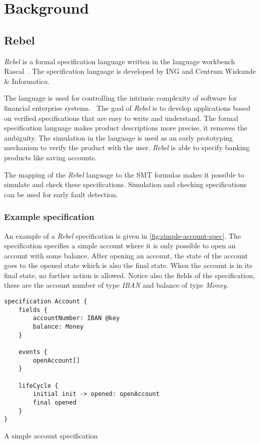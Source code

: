 \chapter{Background}

\section{Rebel}

\textit{Rebel} is a formal specification language written in the language workbench Rascal~\cite{RascalGTTSE}. The specification language is developed by ING and Centrum Wiskunde \& Informatica.

The language is used for controlling the intrinsic complexity of software for financial enterprise systems.~\cite[p.~1]{stoel_storm_vinju_bosman_2016} The goal of \textit{Rebel} is to develop applications based on verified specifications that are easy to write and understand.
The formal specification language makes product descriptions more precise, it removes the ambiguity. The simulation in the language is used as an early prototyping mechanism to verify the product with the user.
\textit{Rebel} is able to specify banking products like saving accounts.

The mapping of the \textit{Rebel} language to the SMT formulas makes it possible to simulate and check these specifications. Simulation and checking specifications can be used for early fault detection.

\subsection{Example specification}
An example of a \textit{Rebel} specification is given in \autoref{fig:simple-account-spec}. The specification specifies a simple account where it is only possible to open an account with some balance. After opening an account, the state of the account goes to the opened state which is also the final state. When the account is in its final state, no further action is allowed. Notice also the fields of the specification, these are the account number of type \textit{IBAN} and balance of type \textit{Money}.

\begin{sourcecode}[h]
\begin{lstlisting}[]
specification Account {
	fields {
		accountNumber: IBAN @key
		balance: Money
	}

	events {
		openAccount[]
	}

	lifeCycle {
		initial init -> opened: openAccount
		final opened
	}
}
\end{lstlisting}
\caption{A simple account specification}\label{fig:simple-account-spec}
\end{sourcecode}

